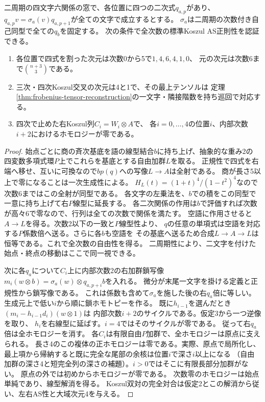\begin{lemma}[正規二次式を持つ二周期窓の有限認証]\label{lem:normal-parameter-six-test}
二周期の四文字六関係の窓で、各位置に四つの二次式$q_{a,p}$があり、
$q_{a,p}v=\sigma_a(v)q_{a,p+1}$が全ての文字で成立するとする。
$\sigma_a$は二周期の次数付き自己同型で全ての$q_b$を固定する。
次の条件で全次数の標準Koszul AS正則性を認証できる。
\begin{enumerate}
\item 各位置で四式を割った次元は次数0から5で$1,4,6,4,1,0$、
元の次元は次数6まで$\binom{n+3}{3}$である。
\item 三次・四次Koszul交叉の次元は4と1で、その最上テンソルは
定理\ref{thm:frobenius-tensor-reconstruction}の一文字・隣接階数を持ち巡回で対応する。
\item 四次で止めた右Koszul列$C_i=W_i\otimes A$で、
各$i=0,\ldots,4$の位置$i$、内部次数$i+2$におけるホモロジーが零である。
\end{enumerate}
\end{lemma}
\begin{proof}
始点ごとに商の斉次基底を語の線型結合$b$に持ち上げ、抽象的な重み2の
四変数多項式環$P$上でこれらを基底とする自由加群$L$を取る。
正規性で四式を右端へ移せ、互いに可換なので$b p(q)$への写像$L\to A$は全射である。
商が長さ5以上で零になることは一次生成性による。
$H_L(t)=(1+t)^4/(1-t^2)^4$なので次数6まではこの全射が同型である。
各文字の左乗法を、$b$での積をこの同型で一意に持ち上げて右$P$線型に延長する。
各二次関係の作用は$b$で評価すれば次数が高々6で零なので、行列は全ての次数で関係を満たす。
空語に作用させると$A\to L$を得る。次数2以下の一致と$P$線型性より、
$q$の任意の単項式は空語を対応する$P$係数倍へ送る。さらに各$b$も空語を
その基底へ送るため合成$L\to A\to L$は恒等である。これで全次数の自由性を得る。
二周期性により、二文字を付けた始点・終点の移動はここで同一視できる。

次に各$q_a$について$C_i$上に内部次数2の右加群鎖写像
$m_i(w\otimes b)=\sigma_a(w)\otimes q_{a,p+i} b$を入れる。
微分が末尾一文字を掛ける定義と正規性から鎖写像である。
これは係数も含めて$\sigma_a$を施した後の右$q_a$倍に等しい。
生成元上で低い$i$から順に鎖ホモトピーを作る。
既に$h_{i-1}$を選んだとき$(m_i-h_{i-1}d_i)(w\otimes1)$は
内部次数$i+2$のサイクルである。仮定3から一つ逆像を取り、
$h_i$を右線型に延ばす。$i=4$ではそのサイクルが零である。
従って右$q_a$倍は全ホモロジーを消す。
各$C_i$は有限自由$P$加群で、全ホモロジーは原点に支えられる。
長さ4のこの複体の正ホモロジーは零である。実際、原点で局所化し、
最上項から帰納すると既に完全な尾部の余核は位置$i$で深さ$i$以上になる
（自由加群の深さ4と短完全列の深さの補題）。$i>0$ではそこに有限長部分加群がない。
原点の外では初めからホモロジーが零である。
次数零のホモロジーは始点単純であり、線型解消を得る。
Koszul双対の完全対合は仮定2とこの解消から従い、左右AS性と大域次元4を与える。
\end{proof}

